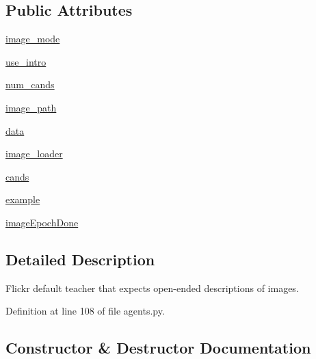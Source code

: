 \subsection*{Public Attributes}
\begin{DoxyCompactItemize}
\item 
\hyperlink{classparlai_1_1tasks_1_1flickr30k_1_1agents_1_1DefaultTeacher_a9172db25337a0e2c2c8348c0f2d63d69}{image\+\_\+mode}
\item 
\hyperlink{classparlai_1_1tasks_1_1flickr30k_1_1agents_1_1DefaultTeacher_a26c3c801b4cd7566cf554c6398e893ce}{use\+\_\+intro}
\item 
\hyperlink{classparlai_1_1tasks_1_1flickr30k_1_1agents_1_1DefaultTeacher_ab11d2ec093158073e7188bcc4170c56a}{num\+\_\+cands}
\item 
\hyperlink{classparlai_1_1tasks_1_1flickr30k_1_1agents_1_1DefaultTeacher_afbcd6505a2f71a7f55429ea316c2a7ea}{image\+\_\+path}
\item 
\hyperlink{classparlai_1_1tasks_1_1flickr30k_1_1agents_1_1DefaultTeacher_a91027d6545dc40fbd4ed09f34404d8e5}{data}
\item 
\hyperlink{classparlai_1_1tasks_1_1flickr30k_1_1agents_1_1DefaultTeacher_a10f2d48d9fabab085243366a708b8f9a}{image\+\_\+loader}
\item 
\hyperlink{classparlai_1_1tasks_1_1flickr30k_1_1agents_1_1DefaultTeacher_a2a1b276618cd9efb01b7b0f21ff338ec}{cands}
\item 
\hyperlink{classparlai_1_1tasks_1_1flickr30k_1_1agents_1_1DefaultTeacher_a541ebd56a221be4a71669e6ff799cf14}{example}
\item 
\hyperlink{classparlai_1_1tasks_1_1flickr30k_1_1agents_1_1DefaultTeacher_a5998c19d0306b5571d17aa38bbc22f73}{image\+Epoch\+Done}
\end{DoxyCompactItemize}


\subsection{Detailed Description}
\begin{DoxyVerb}Flickr default teacher that expects open-ended descriptions of images.
\end{DoxyVerb}
 

Definition at line 108 of file agents.\+py.



\subsection{Constructor \& Destructor Documentation}
\mbox{\label{classparlai_1_1tasks_1_1flickr30k_1_1agents_1_1DefaultTeacher_a656b935d2ed6a7c7c17ec8701c506cc8}} 
